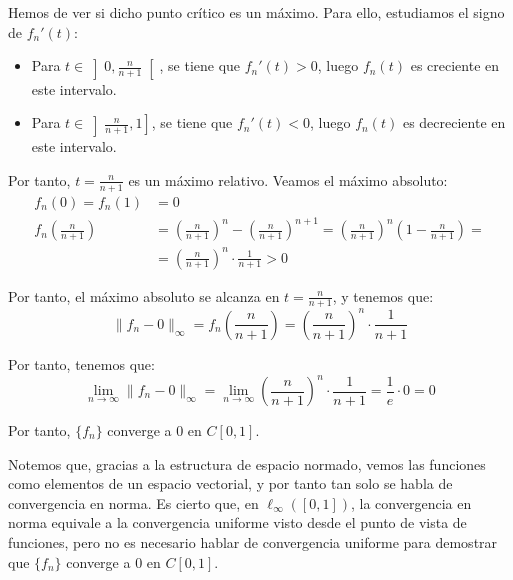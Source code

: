 \begin{ejercicio}
\begin{enumerate}
\begin{itemize}
        Hemos de ver si dicho punto crítico es un máximo. Para ello, estudiamos el signo de $f_n'(t)$:
        \begin{itemize}
            \item Para $t \in \left]0, \frac{n}{n+1}\right[$, se tiene que $f_n'(t) > 0$, luego $f_n(t)$ es creciente en este intervalo.
            \item Para $t \in \left]\frac{n}{n+1}, 1\right]$, se tiene que $f_n'(t) < 0$, luego $f_n(t)$ es decreciente en este intervalo.
        \end{itemize}

        Por tanto, $t = \frac{n}{n+1}$ es un máximo relativo. Veamos el máximo absoluto:
        \begin{align*}
            f_n(0) = f_n(1) &= 0
            \\f_n\left(\frac{n}{n+1}\right) &= \left(\frac{n}{n+1}\right)^n - \left(\frac{n}{n+1}\right)^{n+1} = \left(\frac{n}{n+1}\right)^n \left(1 - \frac{n}{n+1}\right) =\\&= \left(\frac{n}{n+1}\right)^n \cdot \frac{1}{n+1}>0
        \end{align*}

        Por tanto, el máximo absoluto se alcanza en $t = \frac{n}{n+1}$, y tenemos que:
        \begin{equation*}
            \|f_n-0\|_\infty = f_n\left(\frac{n}{n+1}\right) = \left(\frac{n}{n+1}\right)^n \cdot \frac{1}{n+1}
        \end{equation*}

        Por tanto, tenemos que:
        \begin{equation*}
            \lim_{n \to \infty} \|f_n-0\|_\infty = \lim_{n \to \infty} \left(\frac{n}{n+1}\right)^n \cdot \frac{1}{n+1} = \dfrac{1}{e} \cdot 0 = 0
        \end{equation*}

        Por tanto, $\{f_n\}$ converge a $0$ en $C\left[0, 1\right]$.
        \begin{observacion}
            Notemos que, gracias a la estructura de espacio normado, vemos las funciones como elementos de un espacio vectorial, y por tanto tan solo se habla de convergencia en norma. Es cierto que, en $\ell_\infty([0, 1])$, la convergencia en norma equivale a la convergencia uniforme visto desde el punto de vista de funciones, pero no es necesario hablar de convergencia uniforme para demostrar que $\{f_n\}$ converge a $0$ en $C\left[0, 1\right]$.
        \end{observacion}


\end{itemize}
\end{enumerate}
\end{ejercicio}
